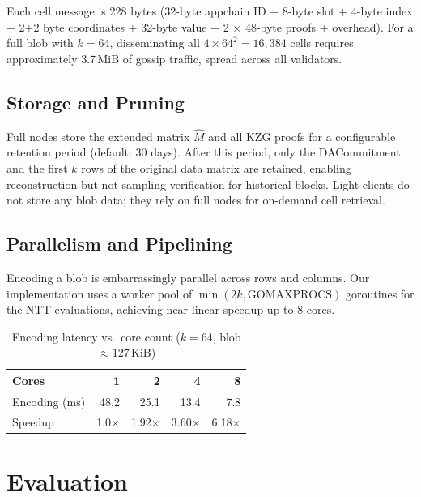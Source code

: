 \documentclass[11pt,a4paper]{article}
\theoremstyle{plain}
\theoremstyle{definition}
\theoremstyle{remark}
\begin{document}
Each cell message is 228 bytes (32-byte appchain ID + 8-byte slot + 4-byte index + 2+2 byte
coordinates + 32-byte value + 2 $\times$ 48-byte proofs + overhead). For a full blob with
$k=64$, disseminating all $4 \times 64^2 = 16{,}384$ cells requires approximately 3.7\,MiB
of gossip traffic, spread across all validators.

\subsection{Storage and Pruning}

Full nodes store the extended matrix $\hat{M}$ and all KZG proofs for a configurable retention
period (default: 30 days). After this period, only the DACommitment and the first $k$ rows of
the original data matrix are retained, enabling reconstruction but not sampling verification
for historical blocks. Light clients do not store any blob data; they rely on full nodes for
on-demand cell retrieval.

\subsection{Parallelism and Pipelining}

Encoding a blob is embarrassingly parallel across rows and columns. Our implementation uses
a worker pool of $\min(2k, \text{GOMAXPROCS})$ goroutines for the NTT evaluations, achieving
near-linear speedup up to 8 cores.

\begin{table}[H]
\centering
\caption{Encoding latency vs.\ core count ($k = 64$, blob $\approx 127$\,KiB)}
\label{tab:encoding-parallel}
\begin{tabular}{lrrrr}
\toprule
\textbf{Cores} & 1 & 2 & 4 & 8 \\
\midrule
Encoding (ms) & 48.2 & 25.1 & 13.4 & 7.8 \\
Speedup & 1.0$\times$ & 1.92$\times$ & 3.60$\times$ & 6.18$\times$ \\
\bottomrule
\end{tabular}
\end{table}


\section{Evaluation}
\label{sec:evaluation}
\end{document}
